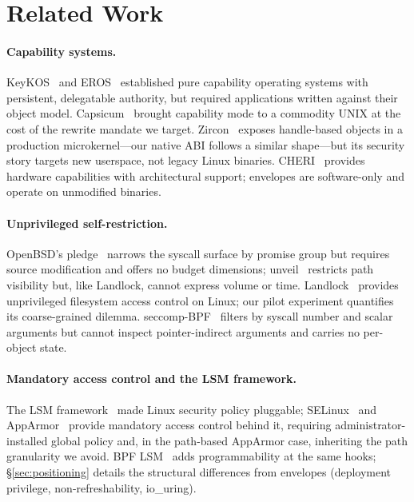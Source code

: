 \documentclass[letterpaper,twocolumn,10pt]{article}
\begin{document}
\section{Related Work}
\label{sec:related}

\paragraph{Capability systems.}
KeyKOS~\cite{hardy1985keykos} and EROS~\cite{shapiro1999eros}
established pure capability operating systems with persistent,
delegatable authority, but required applications written against their
object model.  Capsicum~\cite{watson2010capsicum} brought capability
mode to a commodity UNIX at the cost of the rewrite mandate we target.
Zircon~\cite{zircon2023} exposes handle-based objects in a production
microkernel---our native ABI follows a similar shape---but its security
story targets new userspace, not legacy Linux binaries.
CHERI~\cite{woodruff2014cheri} provides hardware capabilities with
architectural support; envelopes are software-only and operate on
unmodified binaries.

\paragraph{Unprivileged self-restriction.}
OpenBSD's pledge~\cite{pledge2} narrows the syscall surface by promise
group but requires source modification and offers no budget dimensions;
unveil~\cite{unveil2} restricts path visibility but, like Landlock,
cannot express volume or time.
Landlock~\cite{landlock2023} provides unprivileged filesystem access
control on Linux; our pilot experiment quantifies its coarse-grained
dilemma.  seccomp-BPF~\cite{seccomp2012} filters by syscall number and
scalar arguments but cannot inspect pointer-indirect arguments and
carries no per-object state.

\paragraph{Mandatory access control and the LSM framework.}
The LSM framework~\cite{wright2002lsm} made Linux security policy
pluggable; SELinux~\cite{loscocco2001selinux} and
AppArmor~\cite{cowan2000subdomain} provide mandatory access control
behind it, requiring administrator-installed global policy and, in the
path-based AppArmor case, inheriting the path granularity we avoid.
BPF LSM~\cite{krsi2019} adds programmability at the same hooks;
\S\ref{sec:positioning} details the structural differences from
envelopes (deployment privilege, non-refreshability, io\_uring).
\end{document}
